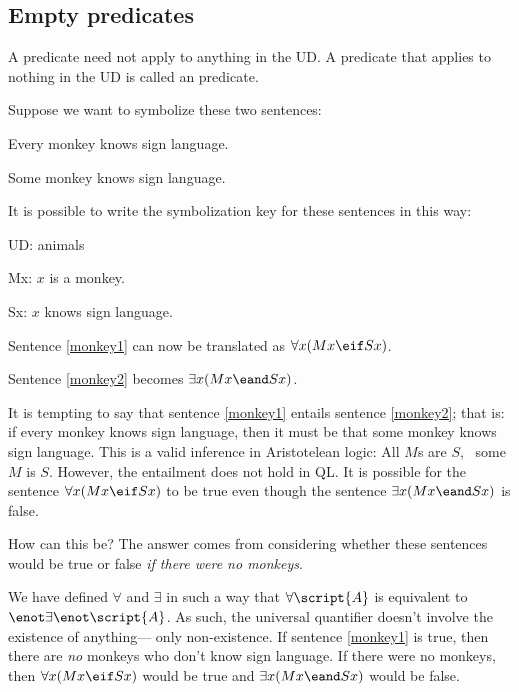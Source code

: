 \subsection{Empty predicates}
A predicate need not apply to anything in the UD. A predicate that applies to nothing in the UD is called an  predicate.

Suppose we want to symbolize these two sentences:
\begin{earg}
\item[\ex{monkey1}]Every monkey knows sign language.
\item[\ex{monkey2}]Some monkey knows sign language.
\end{earg}
It is possible to write the symbolization key for these sentences in this way:
\begin{ekey}
\item[UD:] animals
\item[Mx:] $x$ is a monkey.
\item[Sx:] $x$ knows sign language.
\end{ekey}

Sentence \ref{monkey1} can now be translated as $\forall x(Mx \eif Sx)$.

Sentence \ref{monkey2} becomes $\exists x(Mx \eand Sx)$.

It is tempting to say that sentence \ref{monkey1} entails sentence \ref{monkey2}; that is: if every monkey knows sign language, then it must be that some monkey knows sign language. This is a valid inference in Aristotelean logic: All $M$s are $S$, \therefore\ some $M$ is $S$. However, the entailment does not hold in QL. It is possible for the sentence $\forall x(Mx \eif Sx)$ to be true even though the sentence $\exists x(Mx \eand Sx)$ is false.

How can this be? The answer comes from considering whether these sentences would be true or false \emph{if there were no monkeys}.



We have defined $\forall$ and $\exists$ in such a way that $\forall\script{A}$ is equivalent to $\enot \exists\enot \script{A}$. As such, the universal quantifier doesn't involve the existence of anything--- only non-existence. If sentence \ref{monkey1} is true, then there are \emph{no} monkeys who don't know sign language. If there were no monkeys, then $\forall x(Mx \eif Sx)$ would be true and $\exists x(Mx \eand Sx)$ would be false.


